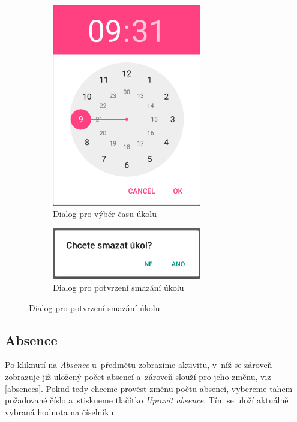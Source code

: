 \documentclass[12pt, a4paper]{article}
\begin{document}
\begin{figure}[ht!]
\begin{subfigure}{.5\textwidth}
				\end{subfigure}%
				\begin{subfigure}{.5\textwidth}
					\centering
					\caption{Dialog pro výběr času úkolu}
					\label{timeDialog}
					\includegraphics[width=6.5cm]{img/timeDialog.png}
				\end{subfigure}
				\begin{subfigure}{.5\textwidth}
					\centering
					\caption{Dialog pro potvrzení smazání úkolu}
					\label{deleteTask}
					\includegraphics[width=6.5cm]{img/deleteTask.png}
				\end{subfigure}
			\end{figure}
			\FloatBarrier
			
		\subsection{Absence}
		Po kliknutí na \emph{Absence} u~předmětu zobrazíme aktivitu, v~níž se zároveň zobrazuje již uložený počet absencí a~zároveň slouží pro jeho změnu, viz \ref{absences}. Pokud tedy chceme provést změnu počtu absencí, vybereme tahem požadované číslo a~stiskneme tlačítko \emph{Upravit absence}. Tím se uloží aktuálně vybraná hodnota na číselníku.
		
\end{document}
